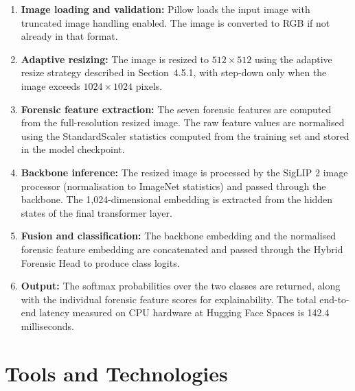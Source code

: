 \begin{enumerate}
    \item \textbf{Image loading and validation:} Pillow loads the input image with truncated image handling enabled. The image is converted to RGB if not already in that format.
    \item \textbf{Adaptive resizing:} The image is resized to $512 \times 512$ using the adaptive resize strategy described in Section~4.5.1, with step-down only when the image exceeds $1024 \times 1024$ pixels.
    \item \textbf{Forensic feature extraction:} The seven forensic features are computed from the full-resolution resized image. The raw feature values are normalised using the StandardScaler statistics computed from the training set and stored in the model checkpoint.
    \item \textbf{Backbone inference:} The resized image is processed by the SigLIP 2 image processor (normalisation to ImageNet statistics) and passed through the backbone. The 1,024-dimensional embedding is extracted from the hidden states of the final transformer layer.
    \item \textbf{Fusion and classification:} The backbone embedding and the normalised forensic feature embedding are concatenated and passed through the Hybrid Forensic Head to produce class logits.
    \item \textbf{Output:} The softmax probabilities over the two classes are returned, along with the individual forensic feature scores for explainability. The total end-to-end latency measured on CPU hardware at Hugging Face Spaces is 142.4 milliseconds.
\end{enumerate}

\section{Tools and Technologies}

